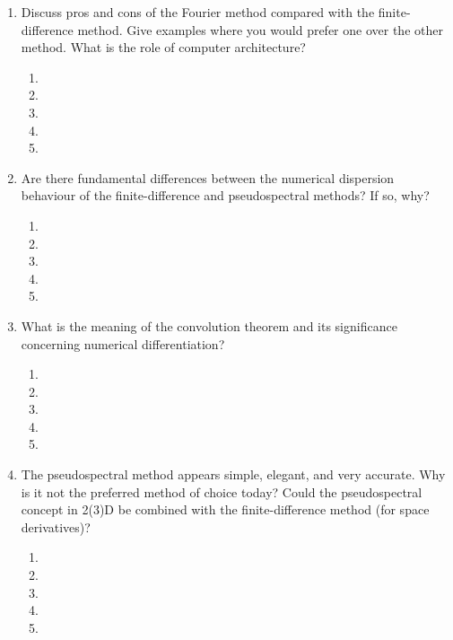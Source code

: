 \begin{enumerate}
\begin{enumerate}
\item[]
\item[]
\item[] 
\item[]
\item[] 
\end{enumerate}
\item
Discuss pros and cons of the Fourier method compared with the finite-difference method. Give examples where you would prefer one over the other method. What is the role of computer architecture?
\begin{enumerate}
\item[]
\item[]
\item[] 
\item[]
\item[] 
\end{enumerate}
\item
Are there fundamental differences between the numerical dispersion behaviour of the finite-difference and pseudospectral methods? If so, why?
\begin{enumerate}
\item[]
\item[]
\item[] 
\item[]
\item[] 
\end{enumerate}
\item
What is the meaning of the convolution theorem and its significance concerning numerical differentiation?
\begin{enumerate}
\item[]
\item[]
\item[] 
\item[]
\item[] 
\end{enumerate}
\item
The pseudospectral method appears simple, elegant, and very accurate. Why is it not the preferred method of choice today? Could the pseudospectral concept in 2(3)D be combined with the finite-difference method (for space derivatives)? 
\begin{enumerate}
\item[]
\item[]
\item[] 
\item[]
\item[] 
\end{enumerate}
\end{enumerate}

